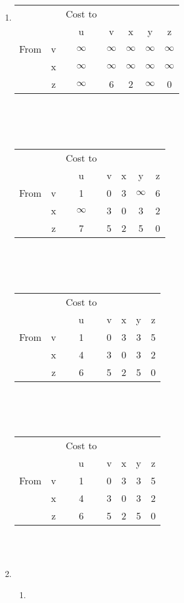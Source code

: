 \documentclass[12pt]{article}
\begin{document}
\begin{enumerate}
	\item 
		\begin{tabular}{c c|c c c c c}
		 & & Cost to\\
		 & & u & v & x & y & z\\
		 \hline
		 From & v & $\infty$ & $\infty$ & $\infty$ & $\infty$ & $\infty$\\
		 & x & $\infty$ & $\infty$ & $\infty$ & $\infty$ & $\infty$\\
		 & z & $\infty$ & 6 & 2 & $\infty$ & 0
		\end{tabular}\\
		\\
		\\
		\begin{tabular}{c c|c c c c c}
		 & & Cost to\\
		 & & u & v & x & y & z\\
		 \hline
		 From & v & 1 & 0 & 3 & $\infty$ & 6\\
		 & x & $\infty$ & 3 & 0 & 3 & 2\\
		 & z & 7 & 5 & 2 & 5 & 0
		\end{tabular}\\
		\\
		\\
		\begin{tabular}{c c|c c c c c}
		 & & Cost to\\
		 & & u & v & x & y & z\\
		 \hline
		 From & v & 1 & 0 & 3 & 3 & 5\\
		 & x & 4 & 3 & 0 & 3 & 2\\
		 & z & 6 & 5 & 2 & 5 & 0
		\end{tabular}\\
		\\
		\\
		\begin{tabular}{c c|c c c c c}
		 & & Cost to\\
		 & & u & v & x & y & z\\
		 \hline
		 From & v & 1 & 0 & 3 & 3 & 5\\
		 & x & 4 & 3 & 0 & 3 & 2\\
		 & z & 6 & 5 & 2 & 5 & 0
		\end{tabular}\\
		\\
	\item \begin{enumerate}

			\item \begin{tabular}{c|c c}


\end{tabular}
\end{enumerate}
\end{enumerate}
\end{document}
